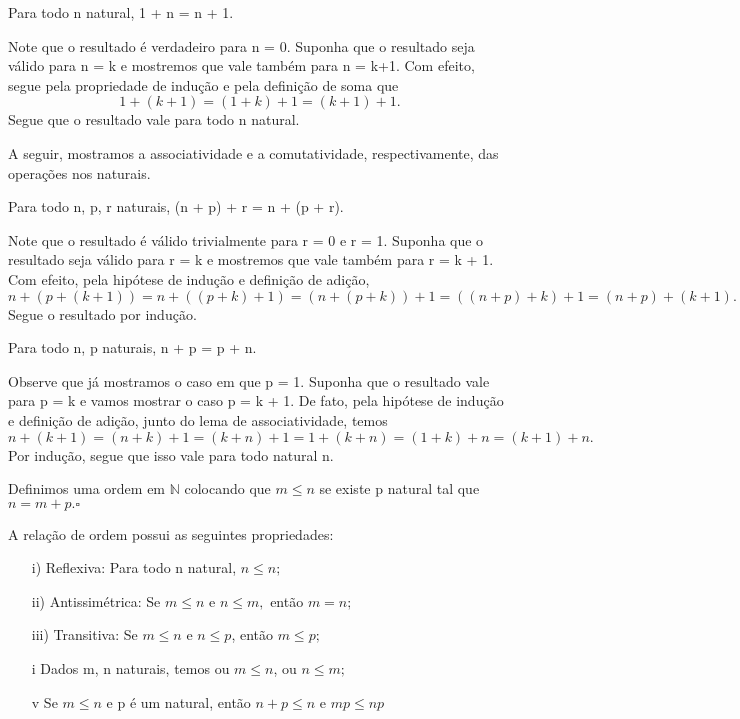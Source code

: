 \documentclass[Analysis/analysis_notes.tex]{subfiles}
\begin{document}
\begin{lemma*}
	Para todo n natural, 1 + n = n + 1.
\end{lemma*}
\begin{proof*}
	Note que o resultado \'e verdadeiro para n = 0. Suponha que o resultado seja v\'alido para n = k e mostremos que
	vale tamb\'em para n = k+1. Com efeito, segue pela propriedade de indu\c c\~ao e pela defini\c c\~ao de soma que
	$$
		1 + (k + 1) = (1 + k) + 1 =  (k + 1) + 1.
	$$
	Segue que o resultado vale para todo n natural. \qedsymbol
\end{proof*}
A seguir, mostramos a associatividade e a comutatividade, respectivamente, das opera\c c\~oes nos naturais.
\begin{lemma*}
	Para todo n, p, r naturais, (n + p) + r = n + (p + r).
\end{lemma*}
\begin{proof*}
	Note que o resultado \'e v\'alido trivialmente para r = 0 e r = 1. Suponha que o resultado seja v\'alido para
	r = k e mostremos que vale tamb\'em para r = k + 1. Com efeito, pela hip\'otese de indu\c c\~ao e defini\c c\~ao de adi\c c\~ao,
	$$
		n + (p + (k + 1)) = n + ((p + k) + 1) = (n + (p + k)) + 1 = ((n + p) + k) + 1 = (n + p) + (k + 1).
	$$
	Segue o resultado por indu\c c\~ao. \qedsymbol
\end{proof*}
\begin{lemma*}
	Para todo n, p naturais, n + p = p + n.
\end{lemma*}
\begin{proof*}
	Observe que j\'a mostramos o caso em que p = 1. Suponha que o resultado vale para p = k e vamos mostrar o caso
	p = k + 1. De fato, pela hip\'otese de indu\c c\~ao e defini\c c\~ao de adi\c c\~ao, junto do lema de associatividade,
	temos
	$$
		n + (k + 1) = (n + k) + 1 = (k + n) + 1 = 1 + (k + n) = (1 + k) + n = (k + 1) + n.
	$$
	Por indu\c c\~ao, segue que isso vale para todo natural n. \qedsymbol
\end{proof*}

\begin{def*}
	Definimos uma ordem em $\mathbb{N}$ colocando que $m\leq{n}$ se existe p natural tal que $n = m + p. \square$
\end{def*}
A rela\c c\~ao de ordem possui as seguintes propriedades:
\begin{itemize}
	\item[i)] Reflexiva: Para todo n natural, $n\leq{n};$
	\item[ii)] Antissim\'etrica: Se $m\leq n$ e $n\leq m,$ ent\~ao $m = n;$
	\item[iii)] Transitiva: Se $m \leq n$ e $n \leq p$, ent\~ao $m\leq p;$
	\item[i] Dados m, n naturais, temos ou $m \leq n$, ou $n \leq m;$
	\item[v] Se $m \leq n$ e p \'e um natural, ent\~ao $n + p\leq n\text{ e } mp\leq np$
\end{itemize}
\end{document}
